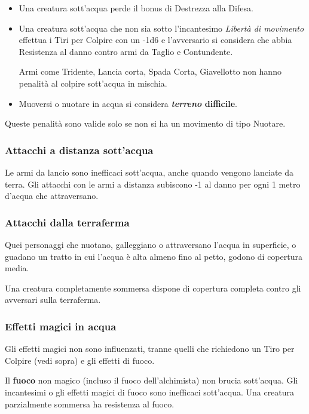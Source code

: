 \begin{multicols}{2}
\begin{itemize}[leftmargin=*] \setlength{\itemsep}{0pt}
\item
Una creatura sott'acqua perde il bonus di Destrezza alla Difesa.
\item
Una creatura sott'acqua che non sia sotto l'incantesimo \emph{Libertà di movimento} effettua i Tiri per Colpire con un -1d6 e l'avversario si considera che abbia Resistenza al danno contro armi da Taglio e Contundente.

Armi come Tridente, Lancia corta, Spada Corta, Giavellotto non hanno penalità al colpire sott'acqua in mischia.
\item
Muoversi o nuotare in acqua si considera \textbf{\emph{terreno} difficile}.
\end{itemize}

Queste penalità sono valide solo se non si ha un movimento di tipo Nuotare.

\subsubsection{Attacchi a distanza sott'acqua}
Le armi da lancio sono inefficaci sott'acqua, anche quando vengono lanciate da terra. Gli attacchi con le armi a distanza subiscono -1 al danno per ogni 1 metro d'acqua che attraversano.

\subsubsection{Attacchi dalla terraferma}
Quei personaggi che nuotano, galleggiano o attraversano l'acqua in superficie, o guadano un tratto in cui l'acqua è alta almeno fino al petto, godono di copertura media.

Una creatura completamente sommersa dispone di copertura completa contro gli avversari sulla terraferma.

\subsubsection{Effetti magici in acqua}
Gli effetti magici non sono influenzati, tranne quelli che richiedono un Tiro per Colpire (vedi sopra) e gli effetti di fuoco.

Il \textbf{fuoco} non magico (incluso il fuoco dell'alchimista) non brucia sott'acqua. Gli incantesimi o gli effetti magici di fuoco sono inefficaci sott'acqua. Una creatura parzialmente sommersa ha resistenza al fuoco.


\end{multicols}
